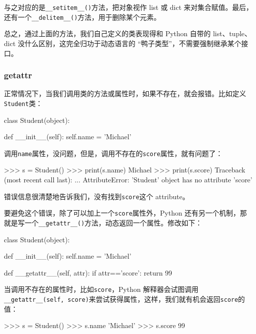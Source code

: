 与之对应的是\texttt{\_\_setitem\_\_()}方法，把对象视作 list 或 dict
来对集合赋值。最后，还有一个\texttt{\_\_delitem\_\_()}方法，用于删除某个元素。

总之，通过上面的方法，我们自己定义的类表现得和 Python 自带的
list、tuple、dict 没什么区别，这完全归功于动态语言的
``鸭子类型''，不需要强制继承某个接口。

\hypertarget{getattr}{%
\subsubsection{\texorpdfstring{\textbf{getattr}}{getattr}}\label{getattr}}

正常情况下，当我们调用类的方法或属性时，如果不存在，就会报错。比如定义\texttt{Student}类：

\begin{pythoncode}
class Student(object):
    
    def __init__(self):
        self.name = 'Michael'
\end{pythoncode}

调用\texttt{name}属性，没问题，但是，调用不存在的\texttt{score}属性，就有问题了：

\begin{pythoncode}
>>> s = Student()
>>> print(s.name)
Michael
>>> print(s.score)
Traceback (most recent call last):
  ...
AttributeError: 'Student' object has no attribute 'score'
\end{pythoncode}

错误信息很清楚地告诉我们，没有找到\texttt{score}这个 attribute。

要避免这个错误，除了可以加上一个\texttt{score}属性外，Python
还有另一个机制，那就是写一个\texttt{\_\_getattr\_\_()}方法，动态返回一个属性。修改如下：

\begin{pythoncode}
class Student(object):

    def __init__(self):
        self.name = 'Michael'

    def __getattr__(self, attr):
        if attr=='score':
            return 99
\end{pythoncode}

当调用不存在的属性时，比如\texttt{score}，Python
解释器会试图调用\texttt{\_\_getattr\_\_(self,\ \textquotesingle{}score\textquotesingle{})}来尝试获得属性，这样，我们就有机会返回\texttt{score}的值：

\begin{pythoncode}
>>> s = Student()
>>> s.name
'Michael'
>>> s.score
99
\end{pythoncode}

